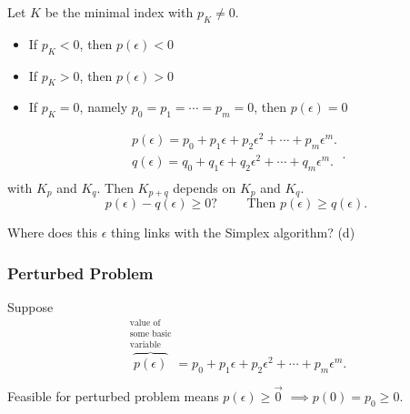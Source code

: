 \begin{definition}
	Let \(K\) be the minimal index with \(p_K \neq 0\).
	\begin{itemize}
		\item If \(p_K < 0\), then \(p(\epsilon) < 0\)
		\item If \(p_K > 0\), then \(p(\epsilon) > 0\)
		\item If \(p_K = 0\), namely \(p_0 = p_1 = \cdots = p_m = 0\), then \(p(\epsilon) = 0\)
	\end{itemize}
\end{definition}

\begin{note}
	\[
		\begin{split}
			p(\epsilon) = p_0 + p_1\epsilon + p_2 \epsilon^2 + \cdots + p_{m}\epsilon^m.	\\
			q(\epsilon) = q_0 + q_1\epsilon + q_2 \epsilon^2 + \cdots + q_{m}\epsilon^m.	\\
		\end{split}.
	\]
	with \(K_p\) and \(K_q\). Then \(K_{p+q}\) depends on \(K_p\) and \(K_q\).
	\[
		p(\epsilon) - q(\epsilon) \geq 0?\qquad \text{ Then }p(\epsilon) \geq  q(\epsilon).
	\]
\end{note}

\begin{problem}
Where does this \(\epsilon \) thing links with the Simplex algorithm? (d)
\end{problem}

\subsubsection{Perturbed Problem}
Suppose
\[
	\overbrace{p(\epsilon)}^{\substack{\text{value of}\\ \text{some basic}\\ \text{variable}}} = p_0 + p_1 \epsilon + p_2 \epsilon^2 + \cdots + p_m \epsilon^m.
\]

Feasible for perturbed problem means \(p(\epsilon) \geq \vec{0}\) \(\implies p(0) = p_0 \geq 0\).

